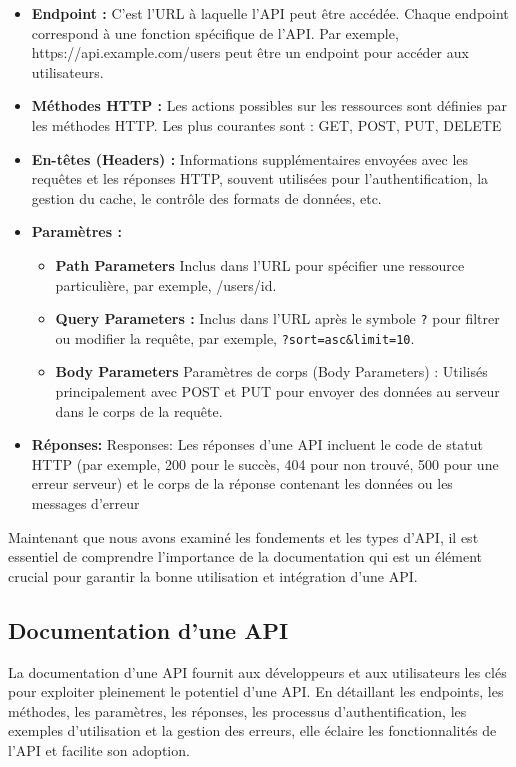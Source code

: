     \begin{itemize}
        \item  \textbf{Endpoint : } C'est l'URL à laquelle l'API peut être accédée. Chaque endpoint correspond à une fonction spécifique de l'API. Par exemple, https://api.example.com/users peut être un endpoint pour accéder aux utilisateurs.
        \item \textbf{Méthodes HTTP : } Les actions possibles sur les ressources sont définies par les méthodes HTTP. Les plus courantes sont : GET, POST, PUT, DELETE
        \item  \textbf{En-têtes (Headers) : }  Informations supplémentaires envoyées avec les requêtes et les réponses HTTP, souvent utilisées pour l'authentification, la gestion du cache, le contrôle des formats de données, etc.
        \item \textbf{ Paramètres :}
        \begin{itemize}
            \item    \textbf{Path Parameters} Inclus dans l'URL pour spécifier une ressource particulière, par exemple, /users/{id}.
            \item \textbf{Query Parameters :} Inclus dans l'URL après le symbole \texttt{?} pour filtrer ou modifier la requête, par exemple, \texttt{?sort=asc\&limit=10}.
            \item  \textbf{Body Parameters}  Paramètres de corps (Body Parameters) : Utilisés principalement avec POST et PUT pour envoyer des données au serveur dans le corps de la requête.
        \end{itemize}
        \item  \textbf{Réponses:} Responses: Les réponses d'une API incluent le code de statut HTTP (par exemple, 200 pour le succès, 404 pour non trouvé, 500 pour une erreur serveur) et le corps de la réponse contenant les données ou les messages d'erreur
    \end{itemize} 
    
    
    Maintenant que nous avons examiné les fondements et les types d'API, il est essentiel de comprendre l'importance de la documentation qui est un élément crucial pour garantir la bonne utilisation et intégration d'une API.

    \subsection{Documentation d'une API }
    La documentation d'une API fournit aux développeurs et aux utilisateurs les clés pour exploiter pleinement le potentiel d'une API. En détaillant les endpoints, les méthodes, les paramètres, les réponses, les processus d'authentification, les exemples d'utilisation et la gestion des erreurs, elle éclaire les fonctionnalités de l'API et facilite son adoption.
